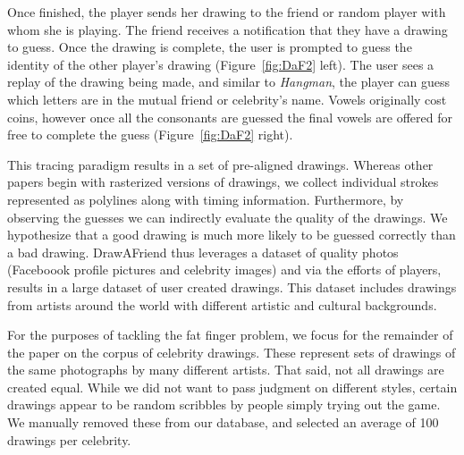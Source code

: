 Once finished, the player sends her drawing to the friend or random player with whom she is playing. The friend receives a notification that they have a drawing to guess. Once the drawing is complete, the user is prompted to guess the identity of the other player's drawing (Figure~\ref{fig:DaF2} left). The user sees a replay of the drawing being made, and similar to {\em Hangman}, the player can guess which letters are in the mutual friend or celebrity's name. Vowels originally cost coins, however once all the consonants are guessed the final vowels are offered for free to complete the guess (Figure~\ref{fig:DaF2} right).

This tracing paradigm results in a set of pre-aligned drawings. Whereas other papers begin with rasterized versions of drawings, we collect individual strokes represented as polylines along with timing information.  Furthermore, by observing the guesses we can indirectly evaluate the quality of the drawings. We hypothesize that a good drawing is much more likely to be guessed correctly than a bad drawing. DrawAFriend thus leverages a dataset of quality photos (Faceboook profile pictures and celebrity images) and via the efforts of players, results in a large dataset of user created drawings. This dataset includes drawings from artists around the world with different artistic and cultural backgrounds.

For the purposes of tackling the fat finger problem, we focus for the remainder of the paper on the corpus of celebrity drawings. These represent sets of drawings of the same photographs by many different artists. That said, not all drawings are created equal. While we did not want to pass judgment on different styles, certain drawings appear to be random scribbles by people simply trying out the game. We manually removed these from our database, and selected an average of 100 drawings per celebrity. 
